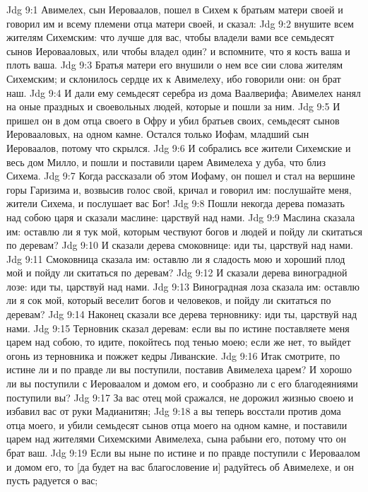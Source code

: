 \vs Jdg 9:1 Авимелех, сын Иероваалов, пошел в Сихем к братьям матери своей и говорил им и всему племени отца матери своей, и сказал:
\vs Jdg 9:2 внушите всем жителям Сихемским: что лучше для вас, чтобы владели вами все семьдесят сынов Иеровааловых, или чтобы владел один? и вспомните, что я кость ваша и плоть ваша.
\vs Jdg 9:3 Братья матери его внушили о нем все сии слова жителям Сихемским; и склонилось сердце их к Авимелеху, ибо говорили они: он брат наш.
\vs Jdg 9:4 И дали ему семьдесят  серебра из дома Ваалверифа; Авимелех нанял на оные праздных и своевольных людей, которые и пошли за ним.
\vs Jdg 9:5 И пришел он в дом отца своего в Офру и убил братьев своих, семьдесят сынов Иеровааловых, на одном камне. Остался только Иофам, младший сын Иероваалов, потому что скрылся.
\vs Jdg 9:6 И собрались все жители Сихемские и весь дом Милло, и пошли и поставили царем Авимелеха у дуба, что близ Сихема.
\rsbpar\vs Jdg 9:7 Когда рассказали об этом Иофаму, он пошел и стал на вершине горы Гаризима и, возвысив голос свой, кричал и говорил им: послушайте меня, жители Сихема, и послушает вас Бог!
\vs Jdg 9:8 Пошли некогда дерева помазать над собою царя и сказали маслине: царствуй над нами.
\vs Jdg 9:9 Маслина сказала им: оставлю ли я тук мой, которым чествуют богов и людей и пойду ли скитаться по деревам?
\vs Jdg 9:10 И сказали дерева смоковнице: иди ты, царствуй над нами.
\vs Jdg 9:11 Смоковница сказала им: оставлю ли я сладость мою и хороший плод мой и пойду ли скитаться по деревам?
\vs Jdg 9:12 И сказали дерева виноградной лозе: иди ты, царствуй над нами.
\vs Jdg 9:13 Виноградная лоза сказала им: оставлю ли я сок мой, который веселит богов и человеков, и пойду ли скитаться по деревам?
\vs Jdg 9:14 Наконец сказали все дерева терновнику: иди ты, царствуй над нами.
\vs Jdg 9:15 Терновник сказал деревам: если вы по истине поставляете меня царем над собою, то идите, покойтесь под тенью моею; если же нет, то выйдет огонь из терновника и пожжет кедры Ливанские.
\vs Jdg 9:16 Итак смотрите, по истине ли и по правде ли вы поступили, поставив Авимелеха царем? И хорошо ли вы поступили с Иероваалом и домом его, и сообразно ли с его благодеяниями поступили вы?
\vs Jdg 9:17 За вас отец мой сражался, не дорожил жизнью своею и избавил вас от руки Мадианитян;
\vs Jdg 9:18 а вы теперь восстали против дома отца моего, и убили семьдесят сынов отца моего на одном камне, и поставили царем над жителями Сихемскими Авимелеха, сына рабыни его, потому что он брат ваш.
\vs Jdg 9:19 Если вы ныне по истине и по правде поступили с Иероваалом и домом его, то [да будет на вас благословение и] радуйтесь об Авимелехе, и он пусть радуется о вас;
